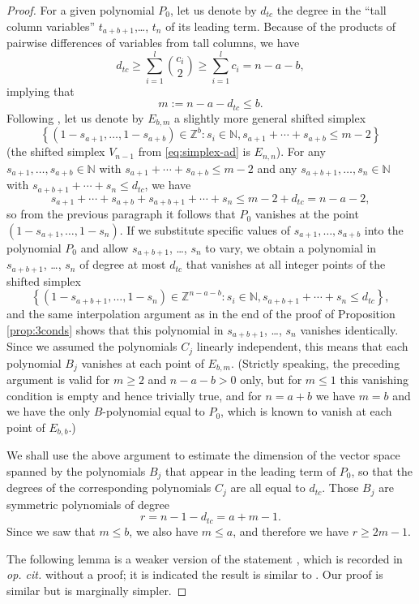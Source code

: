 \documentclass[11pt,reqno]{amsart}
\theoremstyle{plain}
\theoremstyle{definition}
\theoremstyle{remark}
\begin{document}
\begin{proof}
For a given polynomial $P_0$, let us denote by $d_{tc}$ the degree in the ``tall column variables'' $t_{a+b+1}$,\ldots, $t_n$ of its leading term. Because of the products of pairwise differences of variables from tall columns, we have
 \[
d_{tc}\ge \sum_{i=1}^l\binom{c_i}2\ge \sum_{i=1}^l c_i=n-a-b,
 \]
implying that 
 \[
m:=n-a-d_{tc}\le b.     
 \]
Following \cite{MR753873,Mo}, let us denote by $E_{b,m}$ a slightly more general shifted simplex
 \[
\left\{(1-s_{a+1},\ldots,1-s_{a+b})\in\mathbb{Z}^b \colon s_i\in\mathbb{N}, s_{a+1}+\cdots+s_{a+b}\le m-2\right\} 
 \]
(the shifted simplex $V_{n-1}$ from \eqref{eq:simplex-ad} is $E_{n,n}$). 
For any $s_{a+1},\ldots,s_{a+b}\in\mathbb{N}$ with $s_{a+1}+\cdots+s_{a+b}\le m-2$ and any $s_{a+b+1}, \ldots,s_n\in\mathbb{N}$ with $s_{a+b+1}+\cdots+s_n\le d_{tc}$, we have
 \[
s_{a+1}+\cdots+s_{a+b}+s_{a+b+1}+\cdots+s_n\le m-2+d_{tc}=n-a-2,  
 \]
so from the previous paragraph it follows that $P_0$ vanishes at the point $(1-s_{a+1},\ldots,1-s_n)$. If we substitute specific values of $s_{a+1},\ldots,s_{a+b}$ into the polynomial $P_0$ and allow $s_{a+b+1}$, \ldots, $s_n$ to vary, we obtain a polynomial in $s_{a+b+1}$, \ldots, $s_n$ of degree at most $d_{tc}$ that vanishes at all integer points of the shifted simplex 
 \[
\left\{(1-s_{a+b+1},\ldots,1-s_n)\in\mathbb{Z}^{n-a-b}\colon s_i\in\mathbb{N},  s_{a+b+1}+\cdots+s_n\le d_{tc}\right\},     
 \]
and the same interpolation argument as in the end of the proof of Proposition \ref{prop:3conds} shows that this polynomial in $s_{a+b+1}$, \ldots, $s_n$ vanishes identically. Since we assumed the polynomials $C_j$ linearly independent, this means that each polynomial $B_j$ vanishes at each point of 
$E_{b,m}$. (Strictly speaking, the preceding argument is valid for $m\ge 2$ and $n-a-b>0$ only, but for $m\le1$ this vanishing condition is empty and hence trivially true, and for $n=a+b$ we have $m=b$ and we have the only $B$-polynomial equal to $P_0$, which is known to vanish at each point of $E_{b,b}$.) 

We shall use the above argument to estimate the dimension of the vector space spanned by the polynomials $B_j$ that appear in the leading term of $P_0$, so that the degrees of the corresponding polynomials $C_j$ are all equal to $d_{tc}$. Those $B_j$ are symmetric polynomials of degree 
 \[
r=n-1-d_{tc}=a+m-1.     
 \]
Since we saw that $m\le b$, we also have $m\le a$, and therefore we have $r\ge 2m-1$.     

The following lemma is a weaker version of the statement \cite[Lemma 3]{Mo}, which is recorded in \emph{op. cit.} without a proof; it is indicated the result is similar to \cite[Th.~6]{MR753873}. Our proof is similar but is marginally simpler.


\end{proof}
\end{document}

